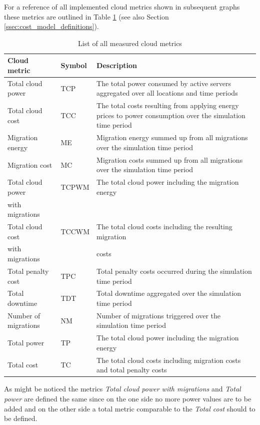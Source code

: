 For a reference of all implemented cloud metrics shown in subsequent graphs these metrics are outlined in Table \ref{tab:list_of_cloud_metrics} (see also Section \ref{ssec:cost_model_definitions}). 


\begin{table}[htbp]
\centering
\begin{tabularx}{\textwidth}{llX}
\toprule
  Cloud metric & Symbol & Description \\
\midrule
	Total cloud power & TCP & The total power consumed by active servers aggregated over all locations and time periods \\
	Total cloud cost & TCC & The total costs resulting from applying energy prices to power consumption over the simulation time period \\
	Migration energy & ME & Migration energy summed up from all migrations over the simulation time period \\
	Migration cost & MC & Migration costs summed up from all migrations over the simulation time period \\
	Total cloud power & TCPWM & The total cloud power including the migration energy \\
	with migrations & & \\
	Total cloud cost & TCCWM & The total cloud costs including the resulting migration \\
	with migrations & & costs \\
	Total penalty cost & TPC & Total penalty costs occurred during the simulation time period \\
	Total downtime & TDT & Total downtime aggregated over the simulation time period \\
	Number of migrations & NM & Number of migrations triggered over the simulation time period \\
	Total power & TP & The total cloud power including the migration energy \\
	Total cost & TC & The total cloud costs including migration costs and total penalty costs \\
\bottomrule
\end{tabularx}
\caption{List of all measured cloud metrics}
\label{tab:list_of_cloud_metrics}
\end{table}

As might be noticed the metrics \textit{Total cloud power with migrations} and \textit{Total power} are defined the same since on the one side no more power values are to be added and on the other side a total metric comparable to the \textit{Total cost} should to be defined. 


